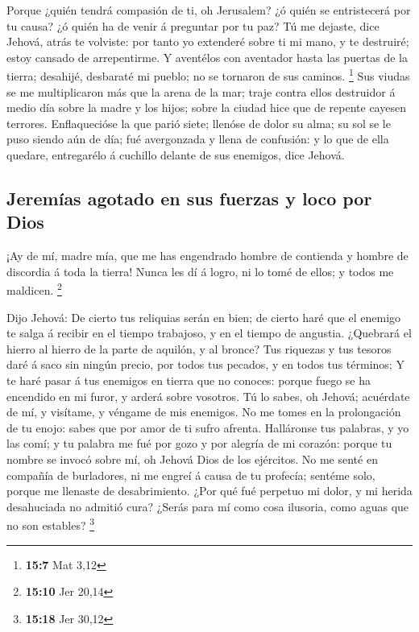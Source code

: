  Porque ¿quién tendrá compasión de ti, oh Jerusalem? ¿ó
quién se entristecerá por tu causa? ¿ó quién ha de venir á preguntar por
tu paz?  Tú me dejaste, dice Jehová, atrás te volviste: por
tanto yo extenderé sobre ti mi mano, y te destruiré; estoy cansado de
arrepentirme.  Y aventélos con aventador hasta las puertas
de la tierra; desahijé, desbaraté mi pueblo; no se tornaron de sus
caminos. \footnote{\textbf{15:7} Mat 3,12}  Sus viudas se me
multiplicaron más que la arena de la mar; traje contra ellos destruidor
á medio día sobre la madre y los hijos; sobre la ciudad hice que de
repente cayesen terrores.  Enflaquecióse la que parió siete;
llenóse de dolor su alma; su sol se le puso siendo aún de día; fué
avergonzada y llena de confusión: y lo que de ella quedare, entregarélo
á cuchillo delante de sus enemigos, dice Jehová.

\hypertarget{jeremuxedas-agotado-en-sus-fuerzas-y-loco-por-dios}{%
\subsection{Jeremías agotado en sus fuerzas y loco por
Dios}\label{jeremuxedas-agotado-en-sus-fuerzas-y-loco-por-dios}}

 ¡Ay de mí, madre mía, que me has engendrado hombre de
contienda y hombre de discordia á toda la tierra! Nunca les dí á logro,
ni lo tomé de ellos; y todos me maldicen. \footnote{\textbf{15:10} Jer
  20,14}

 Dijo Jehová: De cierto tus reliquias serán en bien; de
cierto haré que el enemigo te salga á recibir en el tiempo trabajoso, y
en el tiempo de angustia.  ¿Quebrará el hierro al hierro de
la parte de aquilón, y al bronce?  Tus riquezas y tus
tesoros daré á saco sin ningún precio, por todos tus pecados, y en todos
tus términos;  Y te haré pasar á tus enemigos en tierra que
no conoces: porque fuego se ha encendido en mi furor, y arderá sobre
vosotros.  Tú lo sabes, oh Jehová; acuérdate de mí, y
visítame, y véngame de mis enemigos. No me tomes en la prolongación de
tu enojo: sabes que por amor de ti sufro afrenta. 
Halláronse tus palabras, y yo las comí; y tu palabra me fué por gozo y
por alegría de mi corazón: porque tu nombre se invocó sobre mí, oh
Jehová Dios de los ejércitos.  No me senté en compañía de
burladores, ni me engreí á causa de tu profecía; sentéme solo, porque me
llenaste de desabrimiento.  ¿Por qué fué perpetuo mi dolor,
y mi herida desahuciada no admitió cura? ¿Serás para mí como cosa
ilusoria, como aguas que no son estables? \footnote{\textbf{15:18} Jer
  30,12}

